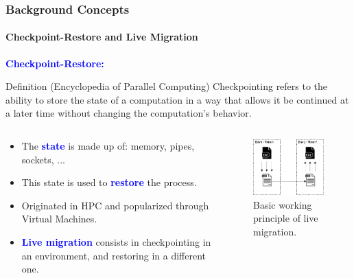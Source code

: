 \documentclass[9pt,    %
    english,            %
    xcolor=table,       %
    envcountsect,        %
    aspectratio=169     %
]{beamer}
\begin{document}
\begin{frame}
    \frametitle{Background Concepts}
    \framesubtitle{Checkpoint-Restore and Live Migration}

    \textcolor{blue}{\textbf{Checkpoint-Restore:}}
    \begin{alertblock}{Definition (Encyclopedia of Parallel Computing)}
        Checkpointing refers to the ability to store the state of a computation in a way that allows it be continued at a later time without changing the computation's behavior.
    \end{alertblock}

    \begin{columns}[t]
        \begin{column}{.65\textwidth}
            \begin{itemize}
                \item The \textbf{\textcolor{blue}{state}} is made up of: memory, pipes, sockets, ...
                \item This state is used to \textbf{\textcolor{blue}{restore}} the process.
                \item Originated in HPC and popularized through Virtual Machines.
                \item \textbf{\textcolor{blue}{Live migration}} consists in checkpointing in an environment, and restoring in a different one.
            \end{itemize}
        \end{column}\hfill
        \begin{column}{.35\textwidth}
            \vspace{-18pt}
            \begin{figure}
                \centering
                \includegraphics[width=.8\textwidth]{./images/cr.png}
                \caption{Basic working principle of live migration.}
            \end{figure}
        \end{column}
    \end{columns}

\end{frame}
\end{document}
